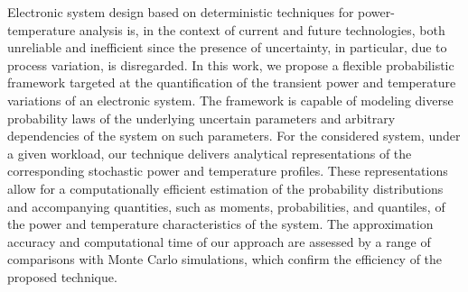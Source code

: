 Electronic system design based on deterministic techniques for power-temperature analysis is, in the context of current and future technologies, both unreliable and inefficient since the presence of uncertainty, in particular, due to process variation, is disregarded.
In this work, we propose a flexible probabilistic framework targeted at the quantification of the transient power and temperature variations of an electronic system.
The framework is capable of modeling diverse probability laws of the underlying uncertain parameters and arbitrary dependencies of the system on such parameters.
For the considered system, under a given workload, our technique delivers analytical representations of the corresponding stochastic power and temperature profiles.
These representations allow for a computationally efficient estimation of the probability distributions and accompanying quantities, such as moments, probabilities, and quantiles, of the power and temperature characteristics of the system.
The approximation accuracy and computational time of our approach are assessed by a range of comparisons with Monte Carlo simulations, which confirm the efficiency of the proposed technique.
